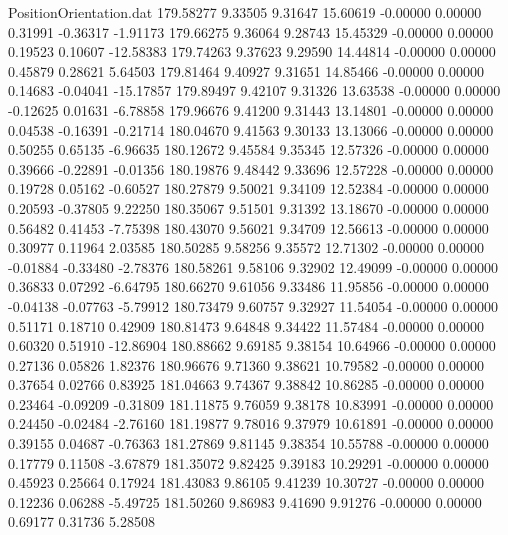 \begin{filecontents}{PositionOrientation.dat}
 179.58277    9.33505    9.31647    15.60619   -0.00000    0.00000    0.31991   -0.36317   -1.91173
 179.66275    9.36064    9.28743    15.45329   -0.00000    0.00000    0.19523    0.10607  -12.58383
 179.74263    9.37623    9.29590    14.44814   -0.00000    0.00000    0.45879    0.28621    5.64503
 179.81464    9.40927    9.31651    14.85466   -0.00000    0.00000    0.14683   -0.04041  -15.17857
 179.89497    9.42107    9.31326    13.63538   -0.00000    0.00000   -0.12625    0.01631   -6.78858
 179.96676    9.41200    9.31443    13.14801   -0.00000    0.00000    0.04538   -0.16391   -0.21714
 180.04670    9.41563    9.30133    13.13066   -0.00000    0.00000    0.50255    0.65135   -6.96635
 180.12672    9.45584    9.35345    12.57326   -0.00000    0.00000    0.39666   -0.22891   -0.01356
 180.19876    9.48442    9.33696    12.57228   -0.00000    0.00000    0.19728    0.05162   -0.60527
 180.27879    9.50021    9.34109    12.52384   -0.00000    0.00000    0.20593   -0.37805    9.22250
 180.35067    9.51501    9.31392    13.18670   -0.00000    0.00000    0.56482    0.41453   -7.75398
 180.43070    9.56021    9.34709    12.56613   -0.00000    0.00000    0.30977    0.11964    2.03585
 180.50285    9.58256    9.35572    12.71302   -0.00000    0.00000   -0.01884   -0.33480   -2.78376
 180.58261    9.58106    9.32902    12.49099   -0.00000    0.00000    0.36833    0.07292   -6.64795
 180.66270    9.61056    9.33486    11.95856   -0.00000    0.00000   -0.04138   -0.07763   -5.79912
 180.73479    9.60757    9.32927    11.54054   -0.00000    0.00000    0.51171    0.18710    0.42909
 180.81473    9.64848    9.34422    11.57484   -0.00000    0.00000    0.60320    0.51910  -12.86904
 180.88662    9.69185    9.38154    10.64966   -0.00000    0.00000    0.27136    0.05826    1.82376
 180.96676    9.71360    9.38621    10.79582   -0.00000    0.00000    0.37654    0.02766    0.83925
 181.04663    9.74367    9.38842    10.86285   -0.00000    0.00000    0.23464   -0.09209   -0.31809
 181.11875    9.76059    9.38178    10.83991   -0.00000    0.00000    0.24450   -0.02484   -2.76160
 181.19877    9.78016    9.37979    10.61891   -0.00000    0.00000    0.39155    0.04687   -0.76363
 181.27869    9.81145    9.38354    10.55788   -0.00000    0.00000    0.17779    0.11508   -3.67879
 181.35072    9.82425    9.39183    10.29291   -0.00000    0.00000    0.45923    0.25664    0.17924
 181.43083    9.86105    9.41239    10.30727   -0.00000    0.00000    0.12236    0.06288   -5.49725
 181.50260    9.86983    9.41690     9.91276   -0.00000    0.00000    0.69177    0.31736    5.28508

\end{filecontents}
